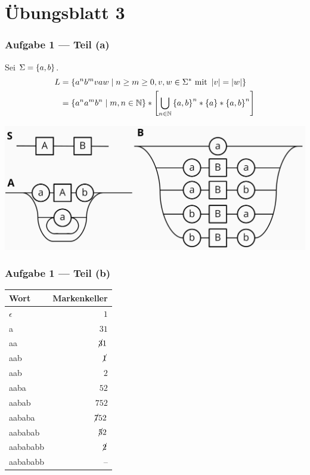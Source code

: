 \documentclass{beamer}
\begin{document}
\section{Übungsblatt 3}

\begin{frame} \frametitle{Aufgabe 1 --- Teil (a)}
	Sei $\Sigma = \left\{ a,b \right\}$.
	\begin{align*}
		L &= \left\{ a^n b^m v a w \mid n \ge m \ge 0, v,w \in \Sigma^\ast \text{ mit } \left| v \right| = \left| w \right| \right\} \\
		&= \left\{ a^n a^m b^n \mid m,n \in \mathbb{N} \right\} * \left[\bigcup_{n \in \mathbb{N}} \left\{ a,b \right\}^n * \left\{ a \right\} * \left\{ a,b \right\}^n \right]
	\end{align*}
	
	\begin{center}
		\includegraphics[width=\textwidth]{tut03_syntax_dia_1a.jpg}
	\end{center}
\end{frame}

\begin{frame} \frametitle{Aufgabe 1 --- Teil (b)}
	\centering
	\begin{tabular}{l|r}
		Wort & Markenkeller \\ \hline
		$\epsilon$ & $1$ \\
		a & $31$ \\
		aa & $\cancel{3}1$ \\
		aab & $\cancel{1}$ \\
		aab & $2$ \\
		aaba & $52$ \\
		aabab & $752$ \\
		aababa & $\cancel{7}52$ \\
		aababab & $\cancel{5}2$ \\
		aabababb & $\cancel{2}$ \\
		aabababb & --
	\end{tabular}
\end{frame}
\end{document}
